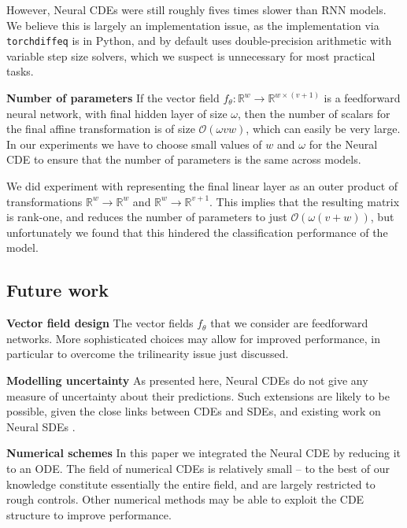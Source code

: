 \documentclass{article}
\theoremstyle{plain}
\theoremstyle{definition}
\newcommand{\reals}{\mathbb{R}}
\newcommand{\bigO}{\mathcal{O}}
\newcommand{\boldheading}[1]{

\textbf{#1}\quad}
\begin{document}
	However, Neural CDEs were still roughly fives times slower than RNN models. We believe this is largely an implementation issue, as the implementation via \texttt{torchdiffeq} is in Python, and by default uses double-precision arithmetic with variable step size solvers, which we suspect is unnecessary for most practical tasks.
	
	\boldheading{Number of parameters}
	If the vector field $f_\theta \colon \reals^w \to \reals^{w \times (v + 1)}$ is a feedforward neural network, with final hidden layer of size $\omega$, then the number of scalars for the final affine transformation is of size $\bigO(\omega v w)$, which can easily be very large. In our experiments we have to choose small values of $w$ and $\omega$ for the Neural CDE to ensure that the number of parameters is the same across models.
	
	We did experiment with representing the final linear layer as an outer product of transformations $\reals^w \to \reals^w$ and $\reals^w \to \reals^{v + 1}$. This implies that the resulting matrix is rank-one, and reduces the number of parameters to just $\bigO(\omega (v + w))$, but unfortunately we found that this hindered the classification performance of the model.
	
	\subsection{Future work}	
	\boldheading{Vector field design}
	The vector fields $f_\theta$ that we consider are feedforward networks. More sophisticated choices may allow for improved performance, in particular to overcome the trilinearity issue just discussed.
	
	\boldheading{Modelling uncertainty}
	As presented here, Neural CDEs do not give any measure of uncertainty about their predictions. Such extensions are likely to be possible, given the close links between CDEs and SDEs, and existing work on Neural SDEs \cite{josef, nsde-generative, stochasticDNF, nsde-normalisation, stochasticnode, scalable-sde, nsde-basic, roughstochasticNF, imanol2020sde}.
	
	\boldheading{Numerical schemes}
	In this paper we integrated the Neural CDE by reducing it to an ODE. The field of numerical CDEs is relatively small -- to the best of our knowledge \cite{lyons2014rough, logode1, logode2, gyurkothesis, arendthesis, dimensionfree, yang2015roughtaylor, jamesthesis, foster2020odemethod} constitute essentially the entire field, and are largely restricted to rough controls. Other numerical methods may be able to exploit the CDE structure to improve performance.
	
\end{document}
